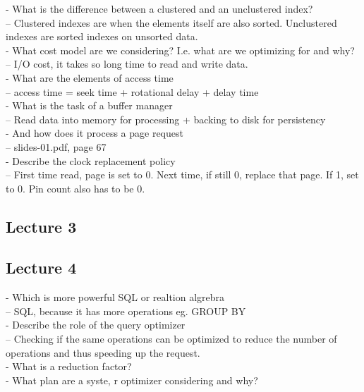 \documentclass[a4paper,10pt,titlepage]{report}
\begin{document}
- What is the difference between a clustered and an unclustered index?\\
 -- Clustered indexes are when the elements itself are also sorted. Unclustered indexes are sorted indexes on unsorted data.\\
 
 - What cost model are we considering? I.e. what are we optimizing for and why?\\
 -- I/O cost, it takes so long time to read and write data.\\
 
 - What are the elements of access time\\
 -- access time = seek time + rotational delay + delay time\\
 
 - What is the task of a buffer manager\\
 -- Read data into memory for processing + backing to disk for persistency\\
 
 - And how does it process a page request\\
 -- slides-01.pdf, page 67\\
 
 - Describe the clock replacement policy\\
 -- First time read, page is set to 0. Next time, if still 0, replace that page. If 1, set to 0. Pin count also has to be 0.

\subsection{Lecture 3}

\subsection{Lecture 4}

- Which is more powerful SQL or realtion algrebra\\
 -- SQL, because it has more operations eg. GROUP BY\\
 
 - Describe the role of the query optimizer\\
 -- Checking if the same operations can be optimized to reduce the number of operations and thus speeding up the request.\\
 
 - What is a reduction factor?\\
 
 - What plan are a syste, r optimizer considering and why?\\
 
\end{document}

